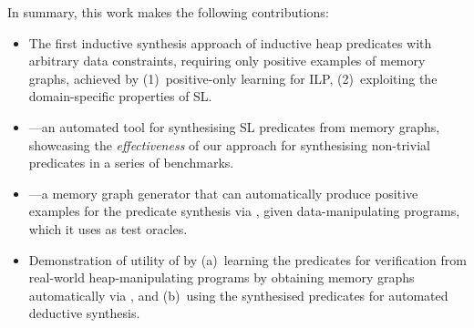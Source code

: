 In summary, this work makes the following contributions:
%

%
\begin{itemize}
\item The first inductive synthesis approach of inductive heap
  predicates with arbitrary data constraints, requiring only positive
  examples of memory graphs, achieved by (1)~positive-only learning
  for ILP, (2)~exploiting the domain-specific properties of SL.
%
\item \tool---an automated tool for synthesising SL predicates from
  memory graphs, showcasing the \emph{effectiveness} of our approach
  for synthesising non-trivial predicates in a series of benchmarks.
%
\item \ggen---a memory graph generator that can automatically produce
  positive examples for the predicate synthesis via \tool, given
  data-manipulating programs, which it uses as test oracles.
%
\item Demonstration of utility of \tool by (a)~learning the predicates
  for verification from real-world heap-manipulating programs by
  obtaining memory graphs automatically via \ggen, and (b)~using the
  synthesised predicates for automated deductive synthesis.
\end{itemize}



